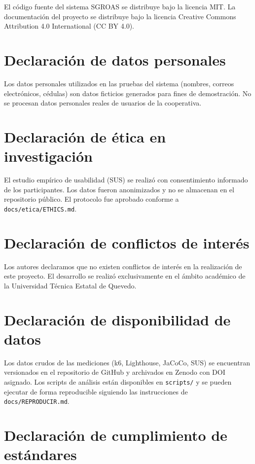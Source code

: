 El código fuente del sistema SGROAS se distribuye bajo la licencia MIT. La documentación del proyecto se distribuye bajo la licencia Creative Commons Attribution 4.0 International (CC BY 4.0).

\section*{Declaración de datos personales}

Los datos personales utilizados en las pruebas del sistema (nombres, correos electrónicos, cédulas) son datos ficticios generados para fines de demostración. No se procesan datos personales reales de usuarios de la cooperativa.

\section*{Declaración de ética en investigación}

El estudio empírico de usabilidad (SUS) se realizó con consentimiento informado de los participantes. Los datos fueron anonimizados y no se almacenan en el repositorio público. El protocolo fue aprobado conforme a \texttt{docs/etica/ETHICS.md}.

\section*{Declaración de conflictos de interés}

Los autores declaramos que no existen conflictos de interés en la realización de este proyecto. El desarrollo se realizó exclusivamente en el ámbito académico de la Universidad Técnica Estatal de Quevedo.

\section*{Declaración de disponibilidad de datos}

Los datos crudos de las mediciones (k6, Lighthouse, JaCoCo, SUS) se encuentran versionados en el repositorio de GitHub y archivados en Zenodo con DOI asignado. Los scripts de análisis están disponibles en \texttt{scripts/} y se pueden ejecutar de forma reproducible siguiendo las instrucciones de \texttt{docs/REPRODUCIR.md}.

\section*{Declaración de cumplimiento de estándares}

